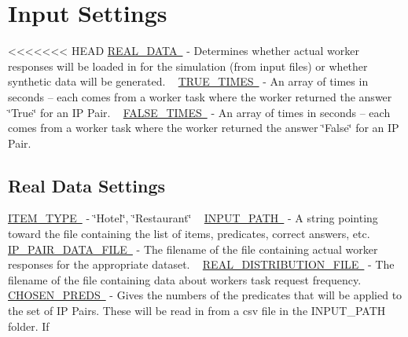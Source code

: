 \hypertarget{toggles_input}{}\section{Input Settings}\label{toggles_input}
<<<<<<< HEAD
\mbox{\hyperlink{namespacedynamicfilterapp_1_1toggles_a00674fe8ef8f59b37d7fe239813bb627}{R\+E\+A\+L\+\_\+\+D\+A\+TA }} -\/ Determines whether actual worker responses will be loaded in for the simulation (from input files) or whether synthetic data will be generated. ~\newline
 \mbox{\hyperlink{namespacedynamicfilterapp_1_1toggles_a6794acc9ab30adea862f4077cf9adae7}{T\+R\+U\+E\+\_\+\+T\+I\+M\+ES }} -\/ An array of times in seconds -- each comes from a worker task where the worker returned the answer \char`\"{}\+True\char`\"{} for an IP Pair. ~\newline
 \mbox{\hyperlink{namespacedynamicfilterapp_1_1toggles_a809d01bf46cd20093532e7cbc0960874}{F\+A\+L\+S\+E\+\_\+\+T\+I\+M\+ES }} -\/ An array of times in seconds -- each comes from a worker task where the worker returned the answer \char`\"{}\+False\char`\"{} for an IP Pair.\hypertarget{toggles_realdata}{}\subsection{Real Data Settings}\label{toggles_realdata}
\mbox{\hyperlink{namespacedynamicfilterapp_1_1toggles_ab7ef0f87c772b28128250ee46f5390ab}{I\+T\+E\+M\+\_\+\+T\+Y\+PE }} -\/ \char`\"{}\+Hotel\char`\"{}, \char`\"{}\+Restaurant\char`\"{} ~\newline
 \mbox{\hyperlink{namespacedynamicfilterapp_1_1toggles_aca6b14e235be3a92f729918cfcfed5e5}{I\+N\+P\+U\+T\+\_\+\+P\+A\+TH }} -\/ A string pointing toward the file containing the list of items, predicates, correct answers, etc.~\newline
 \mbox{\hyperlink{namespacedynamicfilterapp_1_1toggles_a43d654f8629542974ec1db04c0fc580a}{I\+P\+\_\+\+P\+A\+I\+R\+\_\+\+D\+A\+T\+A\+\_\+\+F\+I\+LE }} -\/ The filename of the file containing actual worker responses for the appropriate dataset. ~\newline
 \mbox{\hyperlink{namespacedynamicfilterapp_1_1toggles_ad581376e3eb6ca15bbbe096863891cec}{R\+E\+A\+L\+\_\+\+D\+I\+S\+T\+R\+I\+B\+U\+T\+I\+O\+N\+\_\+\+F\+I\+LE }} -\/ The filename of the file containing data about workers\textquotesingle{} task request frequency. ~\newline
 \mbox{\hyperlink{namespacedynamicfilterapp_1_1toggles_a1e059d484294d0a2661de21590419600}{C\+H\+O\+S\+E\+N\+\_\+\+P\+R\+E\+DS }} -\/ Gives the numbers of the predicates that will be applied to the set of IP Pairs. These will be read in from a csv file in the I\+N\+P\+U\+T\+\_\+\+P\+A\+TH folder. If

